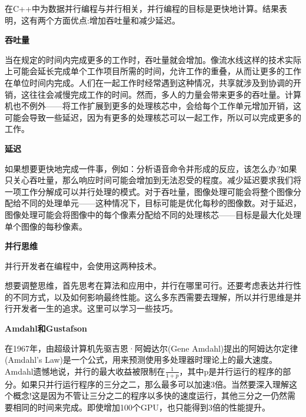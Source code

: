 
在C++中为数据并行编程与并行相关，并行编程的目标是更快地计算。结果表明，这有两个方面优点:增加吞吐量和减少延迟。\par

\hspace*{\fill} \par %
\textbf{吞吐量}

当在规定的时间内完成更多的工作时，吞吐量就会增加。像流水线这样的技术实际上可能会延长完成单个工作项目所需的时间，允许工作的重叠，从而让更多的工作在单位时间内完成。人们在一起工作时经常遇到这种情况，共享就涉及到协调的开销，这往往会减慢完成工作的时间。然而，多人的力量会带来更多的吞吐量。计算机也不例外——将工作扩展到更多的处理核芯中，会给每个工作单元增加开销，这可能会导致一些延迟，因为有更多的处理核芯可以一起工作，所以可以完成更多的工作。\par

\hspace*{\fill} \par %
\textbf{延迟}

如果想要更快地完成一件事，例如：分析语音命令并形成的反应，该怎么办?如果只关心吞吐量，那么响应时间可能会增加到无法忍受的程度。减少延迟要求我们将一项工作分解成可以并行处理的模式。对于吞吐量，图像处理可能会将整个图像分配给不同的处理单元——这种情况下，目标可能是优化每秒的图像数。对于延迟，图像处理可能会将图像中的每个像素分配给不同的处理核芯——目标是最大化处理单个图像的每秒像素。\par

\hspace*{\fill} \par %
\textbf{并行思维}

并行开发者在编程中，会使用这两种技术。\par

想要调整思维，首先思考在算法和应用中，并行在哪里可行。还要考虑表达并行性的不同方式，以及如何影响最终性能。这么多东西需要去理解，所以并行思维是并行开发者一生的追求。这里可以学习一些技巧。\par

\hspace*{\fill} \par %
\textbf{Amdahl和Gustafson}

在1967年，由超级计算机先驱吉恩·阿姆达尔(Gene Amdahl)提出的阿姆达尔定律(Amdahl’s Law)是一个公式，用来预测使用多处理器时理论上的最大速度。Amdahl遗憾地说，并行的最大收益被限制在$\frac{1}{1+p}$，其中p是并行运行的程序的部分。如果只并行运行程序的三分之二，那么最多可以加速3倍。当然要深入理解这个概念!这是因为不管让三分之二的程序以多快的速度运行，其他三分之一仍然需要相同的时间来完成。即使增加100个GPU，也只能得到3倍的性能提升。\par

